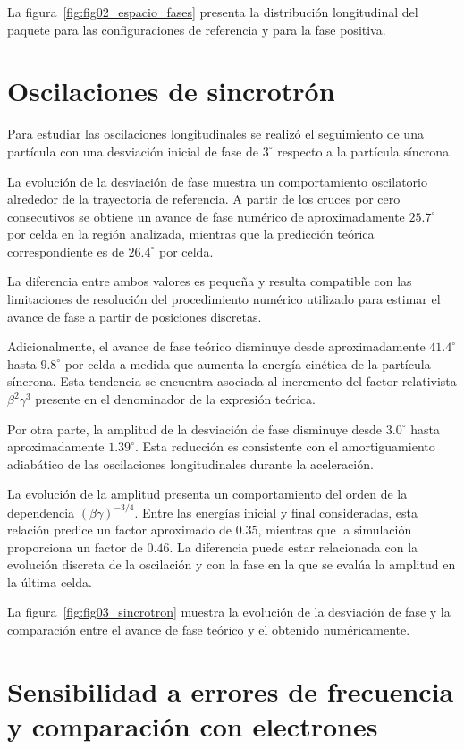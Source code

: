 La figura~\ref{fig:fig02_espacio_fases} presenta la distribución longitudinal del paquete para las configuraciones de referencia y para la fase positiva.

\section{Oscilaciones de sincrotrón}

Para estudiar las oscilaciones longitudinales se realizó el seguimiento de una partícula con una desviación inicial de fase de $3^\circ$ respecto a la partícula síncrona.

La evolución de la desviación de fase muestra un comportamiento oscilatorio alrededor de la trayectoria de referencia. A partir de los cruces por cero consecutivos se obtiene un avance de fase numérico de aproximadamente $25.7^\circ$ por celda en la región analizada, mientras que la predicción teórica correspondiente es de $26.4^\circ$ por celda.

La diferencia entre ambos valores es pequeña y resulta compatible con las limitaciones de resolución del procedimiento numérico utilizado para estimar el avance de fase a partir de posiciones discretas.

Adicionalmente, el avance de fase teórico disminuye desde aproximadamente $41.4^\circ$ hasta $9.8^\circ$ por celda a medida que aumenta la energía cinética de la partícula síncrona. Esta tendencia se encuentra asociada al incremento del factor relativista $\beta^2\gamma^3$ presente en el denominador de la expresión teórica.

Por otra parte, la amplitud de la desviación de fase disminuye desde $3.0^\circ$ hasta aproximadamente $1.39^\circ$. Esta reducción es consistente con el amortiguamiento adiabático de las oscilaciones longitudinales durante la aceleración.

La evolución de la amplitud presenta un comportamiento del orden de la dependencia $(\beta\gamma)^{-3/4}$. Entre las energías inicial y final consideradas, esta relación predice un factor aproximado de $0.35$, mientras que la simulación proporciona un factor de $0.46$. La diferencia puede estar relacionada con la evolución discreta de la oscilación y con la fase en la que se evalúa la amplitud en la última celda.

La figura~\ref{fig:fig03_sincrotron} muestra la evolución de la desviación de fase y la comparación entre el avance de fase teórico y el obtenido numéricamente.

\section{Sensibilidad a errores de frecuencia y comparación con electrones}

